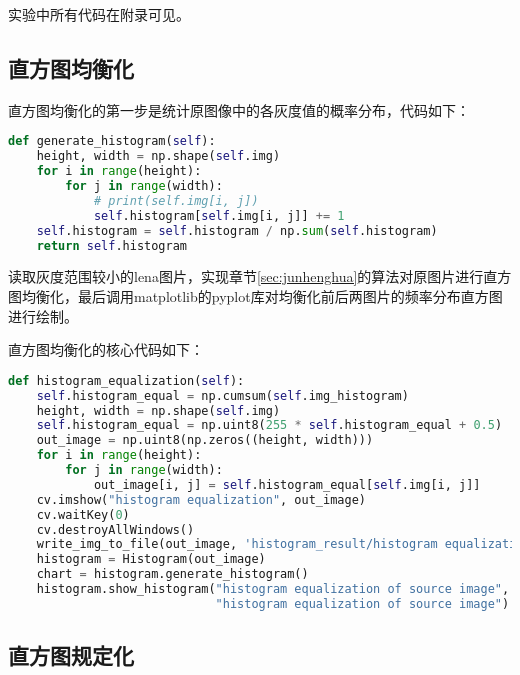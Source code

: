 \documentclass{hitreport}
\begin{document}
实验中所有代码在附录可见。

\subsection{直方图均衡化}\label{sec:junhenghua1}

直方图均衡化的第一步是统计原图像中的各灰度值的概率分布，代码如下：
\begin{lstlisting}[language=python]
def generate_histogram(self):
    height, width = np.shape(self.img)
    for i in range(height):
        for j in range(width):
            # print(self.img[i, j])
            self.histogram[self.img[i, j]] += 1
    self.histogram = self.histogram / np.sum(self.histogram)
    return self.histogram
\end{lstlisting}

读取灰度范围较小的lena图片，实现章节\ref{sec:junhenghua}的算法对原图片进行直方图均衡化，最后调用matplotlib的pyplot库对均衡化前后两图片的频率分布直方图进行绘制。

直方图均衡化的核心代码如下：
\begin{lstlisting}[language=python]
def histogram_equalization(self):
	self.histogram_equal = np.cumsum(self.img_histogram)
    height, width = np.shape(self.img)
    self.histogram_equal = np.uint8(255 * self.histogram_equal + 0.5)
    out_image = np.uint8(np.zeros((height, width)))
    for i in range(height):
        for j in range(width):
            out_image[i, j] = self.histogram_equal[self.img[i, j]]
    cv.imshow("histogram equalization", out_image)
    cv.waitKey(0)
    cv.destroyAllWindows()
    write_img_to_file(out_image, 'histogram_result/histogram equalization of source image')
    histogram = Histogram(out_image)
    chart = histogram.generate_histogram()
    histogram.show_histogram("histogram equalization of source image", '../data/histogram_result/',
                             "histogram equalization of source image")
\end{lstlisting}

\subsection{直方图规定化}\label{sec:guidinghua1}
\end{document}
